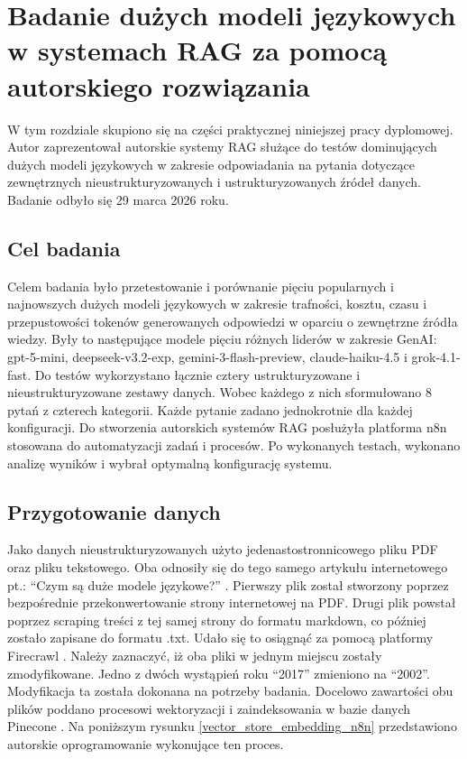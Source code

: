 \cleardoublepage

\chapter{Badanie dużych modeli językowych w systemach RAG za pomocą autorskiego rozwiązania}

W tym rozdziale skupiono się na części praktycznej niniejszej pracy dyplomowej. Autor zaprezentował autorskie systemy RAG służące do testów dominujących dużych modeli językowych w zakresie odpowiadania na pytania dotyczące zewnętrznych nieustrukturyzowanych i ustrukturyzowanych źródeł danych. Badanie odbyło się 29 marca 2026 roku.


    \section{Cel badania}
    Celem badania było przetestowanie i porównanie pięciu popularnych i najnowszych dużych modeli językowych w zakresie trafności, kosztu, czasu i przepustowości tokenów generowanych odpowiedzi w oparciu o zewnętrzne źródła wiedzy. Były to następujące modele pięciu różnych liderów w zakresie GenAI: gpt-5-mini, deepseek-v3.2-exp, gemini-3-flash-preview, claude-haiku-4.5 i grok-4.1-fast. Do testów wykorzystano łącznie cztery ustrukturyzowane i nieustrukturyzowane zestawy danych. Wobec każdego z nich sformułowano 8 pytań z czterech kategorii. Każde pytanie zadano jednokrotnie dla każdej konfiguracji. Do stworzenia autorskich systemów RAG posłużyła platforma n8n \cite{n8n} stosowana do automatyzacji zadań i procesów. Po wykonanych testach, wykonano analizę wyników i wybrał optymalną konfigurację systemu.


    \section{Przygotowanie danych}
    Jako danych nieustrukturyzowanych użyto jedenastostronnicowego pliku PDF oraz pliku tekstowego. Oba odnosiły się do tego samego artykułu internetowego pt.: \enquote{Czym są duże modele językowe?} \cite{oracle_czym_sa_llm}. Pierwszy plik został stworzony poprzez bezpośrednie przekonwertowanie strony internetowej na PDF. Drugi plik powstał poprzez scraping treści z tej samej strony do formatu markdown, co później zostało zapisane do formatu .txt. Udało się to osiągnąć za pomocą platformy Firecrawl \cite{firecrawl}. Należy zaznaczyć, iż oba pliki w jednym miejscu zostały zmodyfikowane. Jedno z dwóch wystąpień roku \enquote{2017} zmieniono na \enquote{2002}. Modyfikacja ta została dokonana na potrzeby badania. Docelowo zawartości obu plików poddano procesowi wektoryzacji i zaindeksowania w bazie danych Pinecone \cite{pinecone}. Na poniższym rysunku \ref{vector_store_embedding_n8n} przedstawiono autorskie oprogramowanie wykonujące ten proces.

